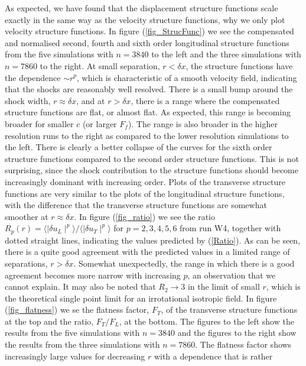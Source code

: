 As expected, we have found that the displacement structure functions scale
exactly in the same way as the velocity structure functions, why we only plot
velocity structure functions. In figure (\ref{fig_StrucFunc}) we see the
compensated and normalised second, fourth and sixth order longitudinal
structure functions from the five simulations with $ n = 3840 $ to the left and
the three simulations with $ n = 7860 $ to the right. At small separation, $ r
< \delta x $, the structure functions have the dependence $ \sim r^{p} $, which
is characteristic of a smooth velocity field, indicating that the shocks are
reasonably well resolved. There is a small bump around the shock width, $ r
\approx \delta x $, and at $ r > \delta x $, there is a range where the
compensated structure functions are flat, or almost flat. As expected, this
range is becoming broader for smaller $ c $ (or larger $ F_f $). The range is
also broader in the higher resolution runs to the right as compared to the
lower resolution simulations to the left. There is clearly a better collapse of
the curves for the sixth order structure functions compared to the second order
structure functions. This is not surprising, since the shock contribution to
the structure functions should become increasingly dominant with increasing
order. Plots of the transverse structure functions are very similar to the
plots of the longitudinal structure functions, with the difference that the
transverse structure functions are somewhat smoother at $ r \approx \delta x $.
In figure (\ref{fig_ratio}) we see the ratio $ R_{p}(r) = \langle \mid \delta
u_L \mid ^{p} \rangle / \langle \mid \delta u_T \mid ^{p} \rangle$ for $ p=
2,3,4,5,6 $ from run W4, together with dotted straight lines, indicating the
values predicted by (\ref{Ratio}). As can be seen, there is a quite good
agreement with the predicted values in a limited range of separations, $ r >
\delta x $. Somewhat unexpectedly, the range in which there is a good agreement
becomes more narrow with increasing $ p $, an observation that we cannot
explain. It may also be noted that $ R_2 \rightarrow 3 $ in the limit of small
$ r $, which is the theoretical single point limit for an irrotational
isotropic field. In figure (\ref{fig_flatness}) we se the flatness factor, $
F_T $, of the transverse structure functions at the top and the ratio, $
F_T/F_L $, at the bottom. The figures to the left show the results from the
five simulations with $ n = 3840 $ and the figures to the right show the
results from the three simulations with $ n = 7860 $. The flatness factor shows
increasingly large values for decreasing $ r $ with a dependence that is rather
